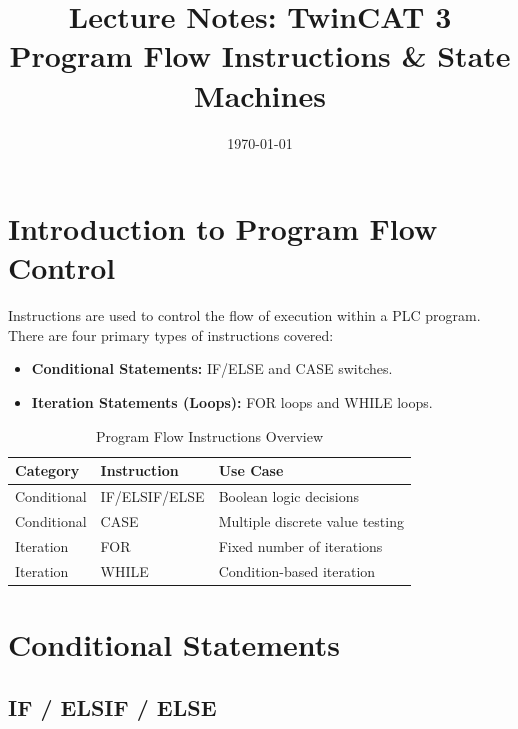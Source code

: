 \documentclass[11pt,a4paper]{article}
\title{
    \vspace{-1cm}
    \textbf{Lecture Notes: TwinCAT 3}\\
    \Large Program Flow Instructions \& State Machines
}
\author{}
\date{\today}
\begin{document}
\maketitle

\tableofcontents
\newpage

\section{Introduction to Program Flow Control}

Instructions are used to control the flow of execution within a PLC program. There are four primary types of instructions covered:

\begin{itemize}[leftmargin=*]
    \item \textbf{Conditional Statements:} IF/ELSE and CASE switches.
    \item \textbf{Iteration Statements (Loops):} FOR loops and WHILE loops.
\end{itemize}

\begin{table}[h]
\centering
\begin{tabular}{@{}lll@{}}
\toprule
\textbf{Category} & \textbf{Instruction} & \textbf{Use Case} \\
\midrule
Conditional & IF/ELSIF/ELSE & Boolean logic decisions \\
Conditional & CASE & Multiple discrete value testing \\
Iteration & FOR & Fixed number of iterations \\
Iteration & WHILE & Condition-based iteration \\
\bottomrule
\end{tabular}
\caption{Program Flow Instructions Overview}
\end{table}

\section{Conditional Statements}

\subsection{IF / ELSIF / ELSE}
\end{document}
